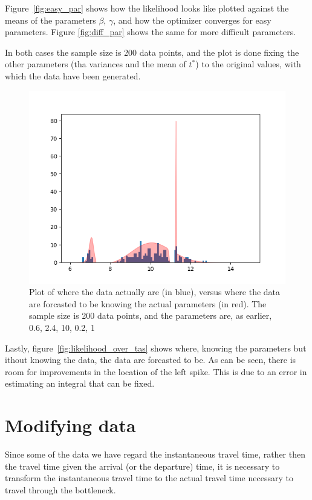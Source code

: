 \documentclass{article}
\begin{document}
Figure~\ref{fig:easy_par} shows how the likelihood looks like plotted against the means of the parameters \(\beta\), \(\gamma\), and how the optimizer converges for easy parameters.
Figure \autoref{fig:diff_par} shows the same for more difficult parameters.

In both cases the sample size is 200 data points, and the plot is done fixing the other parameters (tha variances and the mean of \(t^*\)) to the original values, with which the data have been generated.

\begin{figure}
  \centering
  \includegraphics[width=.8\textwidth]{img/likelihood_over_ta}
  \caption{Plot of where the data actually are (in blue), versus where the data are forcasted to be knowing the actual parameters (in red). The sample size is 200 data points, and the parameters are, as earlier, 0.6, 2.4, 10, 0.2, 1}
  \label{fig:likelihood_over_tas}
\end{figure}

Lastly, figure~\autoref{fig:likelihood_over_tas} shows where, knowing the parameters but ithout knowing the data, the data are forcasted to be.
As can be seen, there is room for improvements in the location of the left spike. This is due to an error in estimating an integral that can be fixed.

\section{Modifying data}

Since some of the data we have regard the instantaneous travel time,
rather then the travel time given the arrival (or the departure) time,
it is necessary to transform the instantaneous travel time to the actual travel time necessary to travel through the bottleneck.
\end{document}
